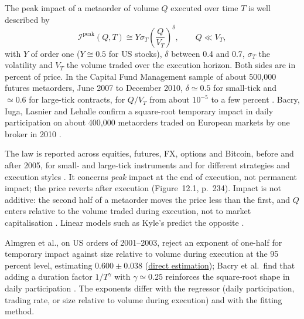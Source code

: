 \begin{qfevidence}\label{ev:square-root-impact}
 The peak impact of a metaorder of volume $Q$ executed over time $T$ is well described by \citep[chap.~12, sec.~12.3.1, eq.~(12.6), p.~234]{catalogue-0528}
\[ \mathcal I^{\mathrm{peak}}(Q,T)\cong Y\sigma_T\left(\frac{Q}{V_T}\right)^{\delta},\qquad Q\ll V_T, \]
with $Y$ of order one ($Y\cong0.5$ for US stocks), $\delta$ between 0.4 and 0.7, $\sigma_T$ the volatility and $V_T$ the volume traded over the execution horizon. Both sides are in percent of price. In the Capital Fund Management sample of about 500{,}000 futures metaorders, June 2007 to December 2010, $\delta\simeq0.5$ for small-tick and $\simeq0.6$ for large-tick contracts, for $Q/V_T$ from about $10^{-5}$ to a few percent \citep[same sec., Figure~12.2, p.~235]{catalogue-0528}. Bacry, Iuga, Lasnier and Lehalle confirm a square-root temporary impact in daily participation on about 400{,}000 metaorders traded on European markets by one broker in 2010 \citep[arXiv preprint of 9 Dec.\ 2014, abstract, p.~1]{wide-bacry-life-cycle}.

 The law is reported across equities, futures, FX, options and Bitcoin, before and after 2005, for small- and large-tick instruments and for different strategies and execution styles \citep[same sec., p.~234]{catalogue-0528}. It concerns \emph{peak} impact at the end of execution, not permanent impact; the price reverts after execution (Figure~12.1, p.~234). Impact is not additive: the second half of a metaorder moves the price less than the first, and $Q$ enters relative to the volume traded during execution, not to market capitalisation \citep[same chap., sec.~12.3.2, pp.~235--236]{catalogue-0528}. Linear models such as Kyle's predict the opposite \citep[same chap., pp.~233 and~241]{catalogue-0528}.

Almgren et al., on US orders of 2001--2003, reject an exponent of one-half for temporary impact against size relative to volume during execution at the 95 percent level, estimating $0.600\pm0.038$ (\hyperref[meth:almgren-impact-estimation]{direct estimation}); Bacry et al.\ find that adding a duration factor $1/T^{\gamma}$ with $\gamma\simeq0.25$ reinforces the square-root shape in daily participation \citep[arXiv preprint of 9 Dec.\ 2014, abstract, p.~1]{wide-bacry-life-cycle}. The exponents differ with the regressor (daily participation, trading rate, or size relative to volume during execution) and with the fitting method.


\end{qfevidence}
